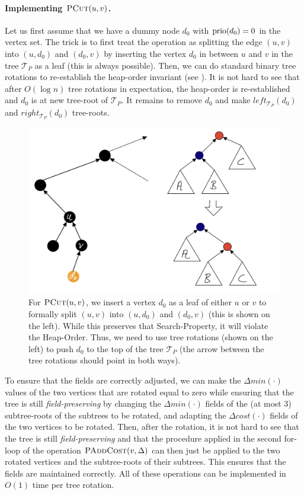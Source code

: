\paragraph{Implementing $\textsc{PCut}(u,v)$.} Let us first assume that we have a dummy node $d_0$ with $\operatorname{prio}(d_0) = 0$ in the vertex set. The trick is to first treat the operation as splitting the edge $(u,v)$ into $(u,d_0)$ and $(d_0,v)$ by inserting the vertex $d_0$ in between $u$ and $v$ in the tree $\mathcal{T}_{P}$ as a leaf (this is always possible). Then, we can do standard binary tree rotations to re-establish the heap-order invariant (see ). It is not hard to see that after $O(\log n)$ tree rotations in expectation, the heap-order is re-established and $d_0$ is at new tree-root of $\mathcal{T}_{P}$. It remains to remove $d_0$ and make $left_{\mathcal{T}_{P}}(d_0)$ and $right_{\mathcal{T}_{P}}(d_0)$ tree-roots.

\begin{figure}[!ht]
    \centering
    \includegraphics[scale=0.2]{./fig/PathCutOperation_lectureDynamicTree.jpeg}
    \caption{For $\textsc{PCut}(u,v)$, we insert a vertex $d_0$ as a leaf of either $u$ or $v$ to formally split $(u,v)$ into $(u,d_0)$ and $(d_0,v)$ (this is shown on the left). While this preserves that Search-Property, it will violate the Heap-Order. Thus, we need to use tree rotations (shown on the left) to push $d_0$ to the top of the tree $\mathcal{T}_{P}$ (the arrow between the tree rotations should point in both ways).}
    \label{fig:PCutRotation}
\end{figure}

To ensure that the fields are correctly adjusted, we can make the $\Delta min(\cdot)$ values of the two vertices that are rotated equal to zero while ensuring that the tree is still \emph{field-preserving} by changing the $\Delta min(\cdot)$ fields of the (at most 3) subtree-roots of the subtrees to be rotated, and adapting the $\Delta cost(\cdot)$ fields of the two vertices to be rotated. Then, after the rotation, it is not hard to see that the tree is still \emph{field-preserving} and that the procedure applied in the second for-loop of the operation $\textsc{PAddCost}(v, \Delta)$ can then just be applied to the two rotated vertices and the subtree-roots of their subtrees. This ensures that the fields are maintained correctly. All of these operations can be implemented in $O(1)$ time per tree rotation.

